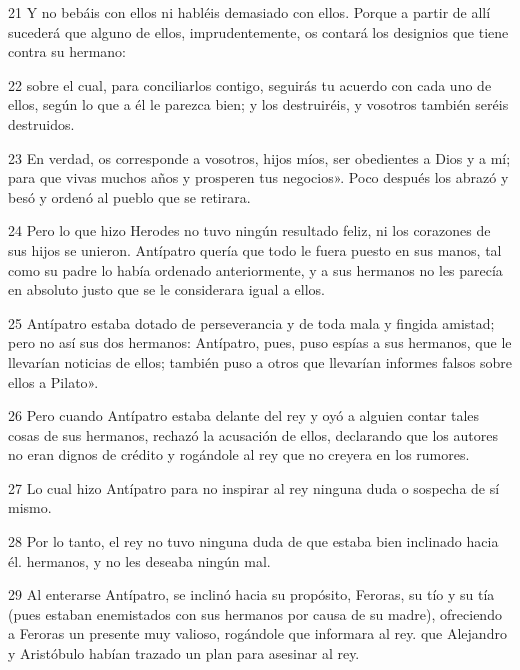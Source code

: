 \par 21 Y no bebáis con ellos ni habléis demasiado con ellos. Porque a partir de allí sucederá que alguno de ellos, imprudentemente, os contará los designios que tiene contra su hermano:

\par 22 sobre el cual, para conciliarlos contigo, seguirás tu acuerdo con cada uno de ellos, según lo que a él le parezca bien; y los destruiréis, y vosotros también seréis destruidos.

\par 23 En verdad, os corresponde a vosotros, hijos míos, ser obedientes a Dios y a mí; para que vivas muchos años y prosperen tus negocios». Poco después los abrazó y besó y ordenó al pueblo que se retirara.

\par 24 Pero lo que hizo Herodes no tuvo ningún resultado feliz, ni los corazones de sus hijos se unieron. Antípatro quería que todo le fuera puesto en sus manos, tal como su padre lo había ordenado anteriormente, y a sus hermanos no les parecía en absoluto justo que se le considerara igual a ellos.

\par 25 Antípatro estaba dotado de perseverancia y de toda mala y fingida amistad; pero no así sus dos hermanos: Antípatro, pues, puso espías a sus hermanos, que le llevarían noticias de ellos; también puso a otros que llevarían informes falsos sobre ellos a Pilato».

\par 26 Pero cuando Antípatro estaba delante del rey y oyó a alguien contar tales cosas de sus hermanos, rechazó la acusación de ellos, declarando que los autores no eran dignos de crédito y rogándole al rey que no creyera en los rumores.

\par 27 Lo cual hizo Antípatro para no inspirar al rey ninguna duda o sospecha de sí mismo.

\par 28 Por lo tanto, el rey no tuvo ninguna duda de que estaba bien inclinado hacia él. hermanos, y no les deseaba ningún mal.

\par 29 Al enterarse Antípatro, se inclinó hacia su propósito, Feroras, su tío y su tía (pues estaban enemistados con sus hermanos por causa de su madre), ofreciendo a Feroras un presente muy valioso, rogándole que informara al rey. que Alejandro y Aristóbulo habían trazado un plan para asesinar al rey.

